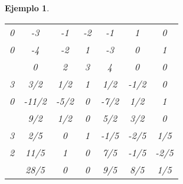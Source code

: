 \documentclass[11pt]{report}
\theoremstyle{mytheorem}
\theoremstyle{mydefinition}
\theoremstyle{myexample}
\newtheorem*{example}{Ejemplo}
\begin{document}
\begin{example}
\begin{center}
\begin{tabular}{|c|c|c|c|c|c|c|}
    0 & -3 & \multicolumn{1}{c}{-1} & \multicolumn{1}{c}{-2} & \multicolumn{1}{c}{-1} & \multicolumn{1}{c}{\phantom{-}1} & \multicolumn{1}{c|}{\phantom{-}0} \\
    
    0 & -4 & \multicolumn{1}{c}{-2} & \multicolumn{1}{c}{\phantom{-}1} & \multicolumn{1}{c}{-3} & \multicolumn{1}{c}{\phantom{-}0} & \multicolumn{1}{c|}{\phantom{-}1} \\ \hline
    
    \multicolumn{1}{c|}{} & \phantom{-}0 & \multicolumn{1}{c}{\phantom{-}2} & \multicolumn{1}{c}{\phantom{-}3} & \multicolumn{1}{c}{\phantom{-}4} & \multicolumn{1}{c}{\phantom{-}0} & \multicolumn{1}{c|}{\phantom{-}0} \\ \hhline{-|=|=|=|=|=|=|}

    3 & \phantom{-}3/2 & \multicolumn{1}{c}{\phantom{-}1/2} & \multicolumn{1}{c}{\phantom{-}1} & \multicolumn{1}{c}{\phantom{-}1/2} & \multicolumn{1}{c}{-1/2} & \multicolumn{1}{c|}{\phantom{-}0} \\
    
    0 & -11/2 & \multicolumn{1}{c}{-5/2} & \multicolumn{1}{c}{\phantom{-}0} & \multicolumn{1}{c}{-7/2} & \multicolumn{1}{c}{\phantom{-}1/2} & \multicolumn{1}{c|}{\phantom{-}1} \\ \hline
    
    \multicolumn{1}{c|}{} & \phantom{-}9/2 & \multicolumn{1}{c}{\phantom{-}1/2} & \multicolumn{1}{c}{\phantom{-}0} & \multicolumn{1}{c}{\phantom{-}5/2} & \multicolumn{1}{c}{\phantom{-}3/2} & \multicolumn{1}{c|}{\phantom{-}0} \\ \hhline{-|=|=|=|=|=|=|}

    3 & \phantom{-}2/5 & \multicolumn{1}{c}{\phantom{-}0} & \multicolumn{1}{c}{\phantom{-}1} & \multicolumn{1}{c}{-1/5} & \multicolumn{1}{c}{-2/5} & \multicolumn{1}{c|}{\phantom{-}1/5} \\
    
    2 & \phantom{-}11/5 & \multicolumn{1}{c}{\phantom{-}1} & \multicolumn{1}{c}{\phantom{-}0} & \multicolumn{1}{c}{\phantom{-}7/5} & \multicolumn{1}{c}{-1/5} & \multicolumn{1}{c|}{-2/5} \\ \hline
    
    \multicolumn{1}{c|}{} & \phantom{-}28/5 & \multicolumn{1}{c}{\phantom{-}0} & \multicolumn{1}{c}{\phantom{-}0} & \multicolumn{1}{c}{\phantom{-}9/5} & \multicolumn{1}{c}{\phantom{-}8/5} & \multicolumn{1}{c|}{\phantom{-}1/5} \\
    

\end{tabular}
\end{center}
\end{example}
\end{document}

